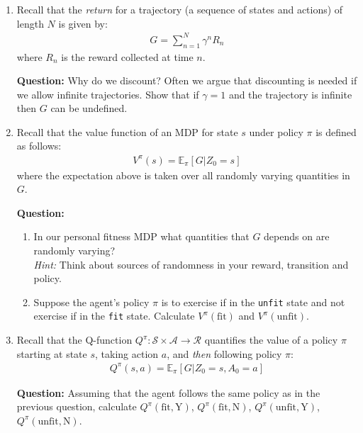 \documentclass[submit]{harvardml}
\begin{document}
\begin{framed}
\begin{enumerate}
     
    \item Recall that the \textit{return} for a trajectory (a sequence of states and actions) of length $N$ is given by:
    \begin{align*}
        G = \sum_{n=1}^N \gamma^n R_n
    \end{align*}
    where $R_n$ is the reward collected at time $n$.

    \textbf{Question:} Why do we discount? Often we argue that discounting is needed if we allow infinite trajectories. Show that if $\gamma = 1$ and the trajectory is infinite then $G$ can be undefined.

    \item Recall that the value function of an MDP for state $s$ under policy $\pi$ is defined as follows:
    \begin{align*}
        V^\pi(s) = \mathbb{E}_{\pi}[G|Z_0 = s]
    \end{align*}
    where the expectation above is taken over all randomly varying quantities in $G$.

    \textbf{Question:}
    \begin{enumerate}
        \item In our personal fitness MDP what quantities that $G$ depends on are randomly varying?\\
        \textit{Hint:} Think about sources of randomness in your reward, transition and policy.
        \item Suppose the agent's policy $\pi$ is to exercise if in the \texttt{unfit} state and not exercise if in the \texttt{fit} state. Calculate $V^{\pi}(\text{fit})$ and $V^{\pi}(\text{unfit})$.
    \end{enumerate}
    

    \item Recall that the Q-function $Q^{\pi}: \mathcal{S} \times \mathcal{A} \rightarrow \mathcal{R}$ quantifies the value of a policy $\pi$ starting at state $s$, taking action $a$, and \textit{then} following policy $\pi$:
    \begin{align*}
        Q^{\pi}(s, a) = \mathbb{E}_\pi [G|Z_0 = s, A_0 = a]
    \end{align*}

    \textbf{Question:} Assuming that the agent follows the same policy as in the previous question, calculate $Q^{\pi}(\text{fit}, \text{Y})$, $Q^{\pi}(\text{fit}, \text{N})$, $Q^{\pi}(\text{unfit}, \text{Y})$, $Q^{\pi}(\text{unfit}, \text{N})$.
    \end{enumerate}
\end{framed}
\end{document}
